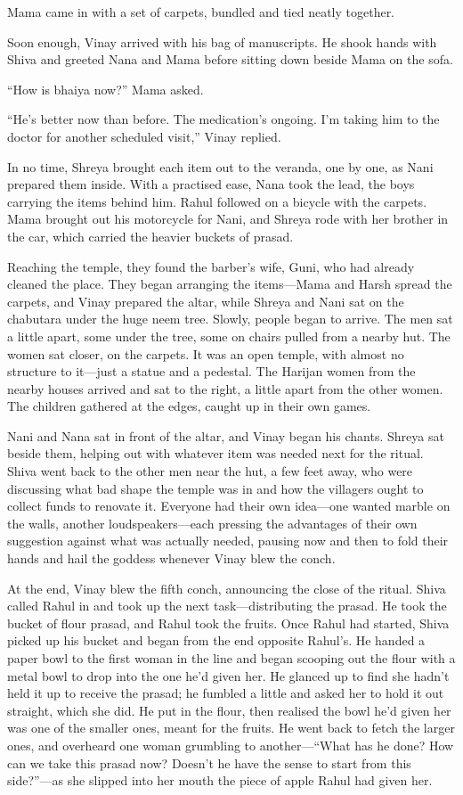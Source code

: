 Mama came in with a set of carpets, bundled and tied neatly together.

Soon enough, Vinay arrived with his bag of manuscripts. He shook hands with Shiva and greeted Nana and Mama before sitting down beside Mama on the sofa.

``How is bhaiya now?'' Mama asked.

``He's better now than before. The medication's ongoing. I'm taking him to the doctor for another scheduled visit,'' Vinay replied.

In no time, Shreya brought each item out to the veranda, one by one, as Nani prepared them inside. With a practised ease, Nana took the lead, the boys carrying the items behind him. Rahul followed on a bicycle with the carpets. Mama brought out his motorcycle for Nani, and Shreya rode with her brother in the car, which carried the heavier buckets of prasad.

Reaching the temple, they found the barber's wife, Guni, who had already cleaned the place. They began arranging the items—Mama and Harsh spread the carpets, and Vinay prepared the altar, while Shreya and Nani sat on the chabutara under the huge neem tree. Slowly, people began to arrive. The men sat a little apart, some under the tree, some on chairs pulled from a nearby hut. The women sat closer, on the carpets. It was an open temple, with almost no structure to it—just a statue and a pedestal. The Harijan women from the nearby houses arrived and sat to the right, a little apart from the other women. The children gathered at the edges, caught up in their own games.

Nani and Nana sat in front of the altar, and Vinay began his chants. Shreya sat beside them, helping out with whatever item was needed next for the ritual. Shiva went back to the other men near the hut, a few feet away, who were discussing what bad shape the temple was in and how the villagers ought to collect funds to renovate it. Everyone had their own idea—one wanted marble on the walls, another loudspeakers—each pressing the advantages of their own suggestion against what was actually needed, pausing now and then to fold their hands and hail the goddess whenever Vinay blew the conch.

At the end, Vinay blew the fifth conch, announcing the close of the ritual. Shiva called Rahul in and took up the next task—distributing the prasad. He took the bucket of flour prasad, and Rahul took the fruits. Once Rahul had started, Shiva picked up his bucket and began from the end opposite Rahul's. He handed a paper bowl to the first woman in the line and began scooping out the flour with a metal bowl to drop into the one he'd given her. He glanced up to find she hadn't held it up to receive the prasad; he fumbled a little and asked her to hold it out straight, which she did. He put in the flour, then realised the bowl he'd given her was one of the smaller ones, meant for the fruits. He went back to fetch the larger ones, and overheard one woman grumbling to another—``What has he done? How can we take this prasad now? Doesn't he have the sense to start from this side?''—as she slipped into her mouth the piece of apple Rahul had given her.

